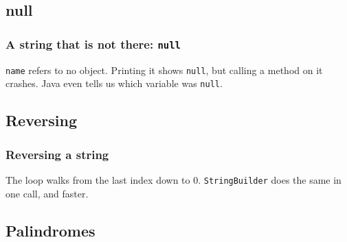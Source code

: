 \documentclass[aspectratio=169,10pt,compress]{beamer}
\begin{document}
\subsection[Null]{null}




\begin{frame}[t,fragile] \frametitle{A string that is not there: \texttt{null}}

  \small \texttt{name} refers to no object. Printing it shows \texttt{null}, but calling a method on it crashes.
  Java even tells us which variable was \texttt{null}.
\end{frame}





\subsection[Reverse]{Reversing}




\begin{frame}[t,fragile] \frametitle{Reversing a string}

  \vspace{0.3em}
  \small The loop walks from the last index down to 0. \texttt{StringBuilder} does the same in one call, and faster.
\end{frame}

\subsection[Palindrome]{Palindromes}
\end{document}
